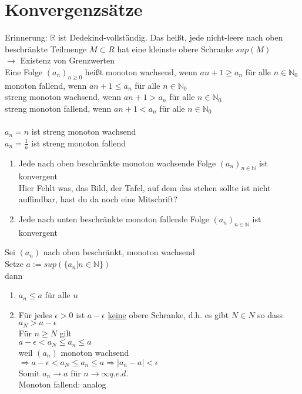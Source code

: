\chapter{Konvergenzsätze}
Erinnerung: $\mathbb{R}$ ist Dedekind-vollständig. Das heißt, jede nicht-leere nach oben beschränkte Teilmenge $M \subset R$ hat eine kleinste obere Schranke $sup(M)$\\
\phantom{XXX}$\to$ Existenz von Grenzwerten\\
Eine Folge $(a_n)_{n \geq 0}$ heißt monoton wachsend, wenn $a{n + 1} \geq a_n$ für alle $n \in \mathbb{N}_0$\\
monoton fallend, wenn $a{n + 1} \leq a_n$ für alle $n \in \mathbb{N}_0$\\
streng monoton wachsend, wenn $a{n + 1} > a_n$ für alle $n \in \mathbb{N}_0$\\
streng monoton fallend, wenn $a{n + 1} < a_n$ für alle $n \in \mathbb{N}_0$\\
\\
\bsp
$a_n = n$ ist streng monoton wachsend\\
$a_n = \frac{1}{n}$ ist streng monoton fallend\\
\begin{enumerate}
\item{Jede nach oben beschränkte monoton wachsende Folge $(a_n)_{n \in \mathbb{N}}$ ist konvergent\\
Hier Fehlt was, das Bild, der Tafel, auf dem das stehen sollte ist nicht auffindbar, hast du da noch eine Mitschrift?
}
\item{Jede nach unten beschränkte monoton fallende Folge $(a_n)_{n \in \mathbb{N}}$ ist konvergent\\
}
\end{enumerate}
\bew
Sei $(a_n)$ nach oben beschränkt, monoton wachsend\\
Setze $a:= sup(\{a_n | n \in \mathbb{N}\})$\\
dann \begin{enumerate}
\item{$a_n \leq a$ für alle $n$}
\item{Für jedes $\epsilon > 0$ ist $a - \epsilon$ \underline{keine} obere Schranke, d.h. es gibt $N \in N$ so dass $a_N > a - \epsilon$
\\Für $n \geq N$ gilt\\
$a - \epsilon < a_N \leq a_n \leq a$\\
weil $(a_n)$ monoton wachsend\\
$\Rightarrow a - \epsilon < a_N \leq a_n \leq a \Rightarrow |a_n -a| < \epsilon$\\
Somit $a_n \to a$ für $n \to \infty$\phantom{XXX}$q.e.d.$\\
Monoton fallend: analog}
\end{enumerate}
